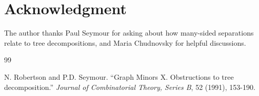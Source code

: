 \documentclass[12pt]{amsart}
\begin{document}

\section*{Acknowledgment}
The author thanks Paul Seymour for asking about how many-sided separations relate to tree decompositions, and Maria Chudnovsky for helpful discussions. 
  \begin{thebibliography} {99}

 N. Robertson and P.D. Seymour. ``Graph Minors X. Obstructions to tree decomposition.'' {\em Journal of Combinatorial Theory, Series B}, 52 (1991),  153-190. \end{thebibliography}
\end{document}
